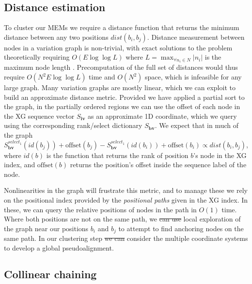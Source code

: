 \documentclass[a4paper,12pt,numbered,oneside]{Classes/PhDThesisPSnPDF}
\providecommand{\DIFaddtex}[1]{{\protect\color{blue}\uwave{#1}}} %
\providecommand{\DIFdeltex}[1]{{\protect\color{red}\sout{#1}}}                      %
\providecommand{\DIFaddbegin}{} %
\providecommand{\DIFaddend}{} %
\providecommand{\DIFdelbegin}{} %
\providecommand{\DIFdelend}{} %
\providecommand{\DIFadd}[1]{\texorpdfstring{\DIFaddtex{#1}}{#1}} %
\providecommand{\DIFdel}[1]{\texorpdfstring{\DIFdeltex{#1}}{}} %
\begin{document}
\DIFaddend \subsection{Distance estimation}
\label{sec:distance_estimation}
To cluster our MEMs we require a distance function that returns the minimum distance between any two positions $dist(b_i, b_j)$. %
Distance measurement between nodes in a variation graph is non-trivial, with exact solutions to the problem theoretically requiring $O(E \log \log L)$ where $L = \max_{\forall n_i \in N} |n_i|$ is the maximum node length \cite{karlsson1983mlog}.
Precomputation of the full set of distances would thus require $O(N^2 E \log \log L)$ time and $O(N^2)$ space, which is infeasible for any large graph.
Many variation graphs are mostly linear, which we can exploit to build an approximate distance metric.
Provided we have applied a partial sort to the graph, in the partially ordered regions we can use the offset of each node in the XG sequence vector $S_\textbf{iv}$ as an approximate 1D coordinate, which we query using the corresponding rank/select dictionary $S_\textbf{bv}$.
We expect that in much of the graph $S_\textbf{bv}^{select_1}(id(b_j))+\mbox{offset}(b_j) - S_\textbf{bv}^{select_1}(id(b_i))+\mbox{offset}(b_i) \propto dist(b_i, b_j)$, where $id(b)$ is the function that returns the rank of position $b$'s node in the XG index, and $\mbox{offset}(b)$ returns the position's offset inside the sequence label of the node.

Nonlinearities in the graph will frustrate this metric, and to manage these we rely on the positional index provided by the \emph{positional paths} given in the XG index.
In these, we can query the relative positions of nodes in the path in $O(1)$ time.
Where both positions are not on the same path, we \DIFdelbegin \DIFdel{can use }\DIFdelend \DIFaddbegin \DIFadd{use a bounded }\DIFaddend local exploration of the graph near our positions $b_i$ and $b_j$ to attempt to find anchoring nodes on the same path.
In our clustering step \DIFdelbegin \DIFdel{we can }\DIFdelend \DIFaddbegin \DIFadd{(section \ref{sec:collinear_chaining}) we }\DIFaddend consider the multiple coordinate systems to develop a global pseudoalignment.

\subsection{Collinear chaining}
\label{sec:collinear_chaining}
\end{document}
